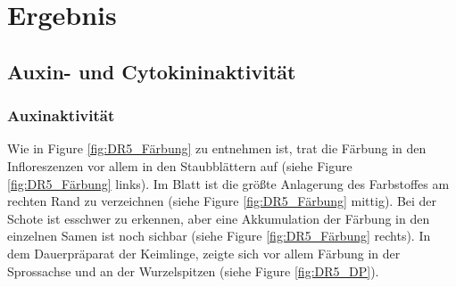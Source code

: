 \documentclass[10pt,a4paper]{article}
\begin{document}
	\section{Ergebnis}
	
	\subsection{Auxin- und Cytokininaktivität}
		\subsubsection{Auxinaktivität}
		Wie in Figure \ref{fig:DR5_Färbung} zu entnehmen ist, trat die Färbung in den Infloreszenzen vor allem in den Staubblättern auf (siehe Figure \ref{fig:DR5_Färbung} links). Im Blatt ist die größte Anlagerung des Farbstoffes am rechten Rand zu verzeichnen  (siehe Figure \ref{fig:DR5_Färbung} mittig). Bei der Schote ist esschwer zu erkennen, aber eine Akkumulation der Färbung in den einzelnen Samen ist noch sichbar (siehe Figure \ref{fig:DR5_Färbung} rechts).﻿ In dem Dauerpräparat der Keimlinge, zeigte sich vor allem Färbung in der Sprossachse und an der Wurzelspitzen (siehe Figure \ref{fig:DR5_DP}).﻿ ﻿ 
\end{document}
